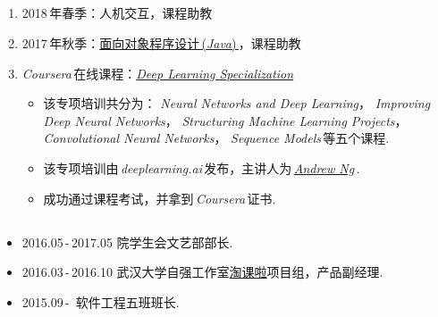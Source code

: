 \documentclass[letterpaper,AutoFakeBold]{twentysecondcv} %
\begin{document}
\begin{CJK*}{UTF8}{gbsn}

\begin{CJK*}{UTF8}{gkai}
\section{}
\end{CJK*}

\begin{enumerate}
	\setlength{\itemsep}{0pt}
	\setlength{\parsep}{0pt}
	\setlength{\parskip}{0pt}
	\item 2018\,年春季：人机交互，课程助教
	\item 2017\,年秋季：\href{http://www.javatree.cn/}{面向对象程序设计\,(\emph{Java})\,}，课程助教
	\item \emph{Coursera\,}在线课程：\href{https://www.coursera.org/specializations/deep-learning}{\emph{Deep Learning Specialization}}
		\begin{itemize}
			\item 该专项培训共分为：
			\emph{Neural Networks and Deep Learning}，
			\emph{Improving Deep Neural Networks}，
			\emph{Structuring Machine Learning Projects}，
			\emph{Convolutional Neural Networks}，
			\emph{Sequence Models}\,等五个课程.
			\item 该专项培训由\,\emph{deeplearning.ai}\,发布，主讲人为\,\href{https://www.coursera.org/instructor/andrewng}{\emph{Andrew Ng}}\,.
			\item 成功通过课程考试，并拿到\,\emph{Coursera}\,证书.
		\end{itemize}
\end{enumerate}


\begin{CJK*}{UTF8}{gkai}
	\section{}
	\end{CJK*}
	
	\begin{itemize}
		\setlength{\itemsep}{0pt}
		\setlength{\parsep}{0pt}
		\setlength{\parskip}{0pt}
		\item 2016.05\,-\,2017.05 \qquad 院学生会文艺部部长.
		\item 2016.03\,-\,2016.10 \qquad 武汉大学自强工作室\href{https://taoke.ziqiang.net.cn/}{淘课啦}项目组，产品副经理.
		\item 2015.09\,-\, \qquad \qquad \qquad 软件工程五班班长.
	\end{itemize}


\end{CJK*}
\end{document}
